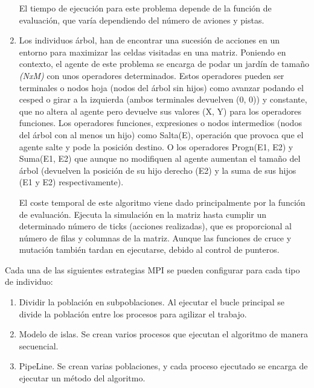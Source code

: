 \begin{enumerate}
		El tiempo de ejecución para este problema depende de la función de evaluación, que varía dependiendo del número de aviones y pistas. 
		
		\item Los individuos árbol, han de encontrar una sucesión de acciones en un entorno para maximizar las celdas visitadas en una matriz. Poniendo en contexto, el agente de este problema se encarga de podar un jardín de tamaño \textit{(NxM)} con unos operadores determinados. Estos operadores pueden ser terminales o nodos hoja (nodos del árbol sin hijos) como avanzar podando el cesped o girar a la izquierda (ambos terminales devuelven (0, 0)) y constante, que no altera al agente pero devuelve sus valores (X, Y) para los operadores funciones. Los operadores funciones, expresiones o nodos intermedios (nodos del árbol con al menos un hijo) como Salta(E), operación que provoca que el agente salte y pode la posición destino. O los operadores Progn(E1, E2) y Suma(E1, E2) que aunque no modifiquen al agente aumentan el tamaño del árbol (devuelven la posición de su hijo derecho (E2) y la suma de sus hijos (E1 y E2) respectivamente).
		
		El coste temporal de este algoritmo viene dado principalmente por la función de evaluación. Ejecuta la simulación en la matriz hasta cumplir un determinado número de ticks (acciones realizadas), que es proporcional al número de filas y columnas de la matriz. Aunque las funciones de cruce y mutación también tardan en ejecutarse, debido al control de punteros.
	\end{enumerate}
	
	
	Cada una de las siguientes estrategias MPI se pueden configurar para cada tipo de individuo:

	\begin{enumerate}
		\item Dividir la población en subpoblaciones. Al ejecutar el bucle principal se divide la población entre los procesos para agilizar el trabajo.
		\item Modelo de islas. Se crean varios procesos que ejecutan el algoritmo de manera secuencial.
		\item PipeLine. Se crean varias poblaciones, y cada proceso ejecutado se encarga de ejecutar un método del algoritmo.
	\end{enumerate}
	

